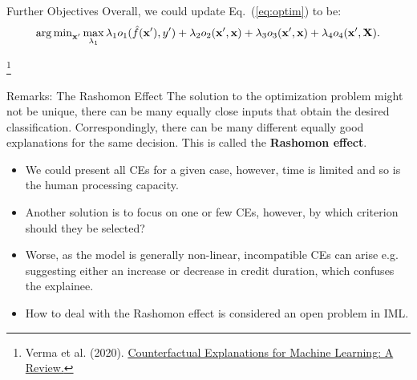 \documentclass[11pt,compress,t,notes=noshow, xcolor=table]{beamer}
\begin{document}
\begin{vbframe}{Further Objectives}
	Overall, we could update Eq.~(\ref{eq:optim}) to be: 
	\begin{equation}
		\argmin_{\xv'} \max_{\lambda_1} \lambda_1 o_1(\fh(\xv'), y') + \lambda_2 o_2(\xv', \xv) + \lambda_3 o_3(\xv', \xv) + \lambda_4 o_4(\xv', \Xmat).
	\end{equation}


\footnote[frame]{Verma et al. (2020). \href{https://arxiv.org/pdf/2010.10596.pdf}{Counterfactual Explanations for Machine Learning: A Review.}}

\end{vbframe}

\begin{vbframe}{Remarks: The Rashomon Effect}
The solution to the optimization problem might not be unique, there can be many equally close inputs that obtain the desired classification. Correspondingly, there can be many different equally good explanations for the same decision. This is called the \textbf{Rashomon effect}.
	\begin{itemize}
		\item We could present all CEs for a given case, however, time is limited and so is the human processing capacity.
		\item Another solution is to focus on one or few CEs, however, by which criterion should they be selected?
		\item Worse, as the model is generally non-linear, incompatible CEs can arise e.g. suggesting either an increase or decrease in credit duration, which confuses the explainee.
		\item How to deal with the Rashomon effect is considered an open problem in IML.
	\end{itemize}
\end{vbframe}
\end{document}
